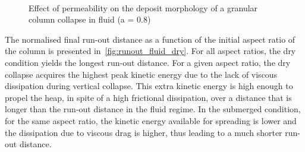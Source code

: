 \begin{figure}
\\
\caption{Effect of permeability on the deposit morphology of a granular column 
collapse in fluid (a = 0.8)}
\label{fig:a08_dense_snapshots}
\end{figure}

The normalised final run-out distance as a function of the initial aspect ratio 
of the column is presented in~\cref{fig:runout_fluid_dry}. For all aspect 
ratios, the dry condition yields the longest run-out distance. For a given 
aspect ratio, the dry collapse acquires the highest peak kinetic energy due to 
the lack of viscous dissipation during vertical collapse. This extra kinetic 
energy is high enough to propel the heap, in spite of a high frictional 
dissipation, over a distance that is longer than the run-out distance in 
the fluid regime. In the submerged condition, for the same aspect ratio, 
the kinetic energy available for spreading is lower and the dissipation 
due to viscous drag is higher, thus leading to a much shorter run-out
distance. 


